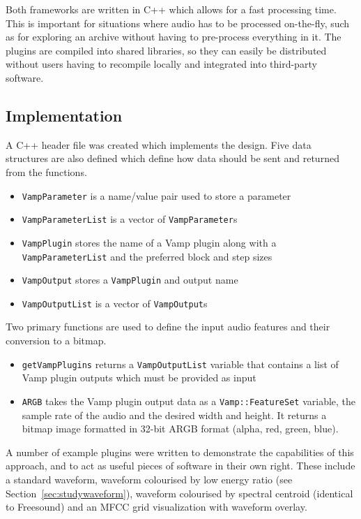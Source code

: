 Both frameworks are written in C++ which allows for a fast processing time.  This is important for situations where
audio has to be processed on-the-fly, such as for exploring an archive without having to pre-process everything in it.
The plugins are compiled into shared libraries, so they can easily be distributed without users having to recompile
locally and integrated into third-party software.

\subsection{Implementation}
A C++ header file was created which implements the design.  Five data structures are also defined which define how data
should be sent and returned from the functions.

{\singlespacing
\begin{itemize}
  \item \texttt{VampParameter} is a name/value pair used to store a parameter
  \item \texttt{VampParameterList} is a vector of \texttt{VampParameter}s
  \item \texttt{VampPlugin} stores the name of a Vamp plugin along with a\\
    \texttt{VampParameterList} and the preferred block and step sizes
  \item \texttt{VampOutput} stores a \texttt{VampPlugin} and output name
  \item \texttt{VampOutputList} is a vector of \texttt{VampOutput}s
\end{itemize}
}

Two primary functions are used to define the input audio features and their conversion to a bitmap.

\begin{itemize}
  \item \texttt{getVampPlugins} returns a \texttt{VampOutputList} variable that contains a list of Vamp plugin outputs
    which must be provided as input
  \item \texttt{ARGB} takes the Vamp plugin output data as a \texttt{Vamp::FeatureSet} variable, the sample rate of the
    audio and the desired width and height. It returns a bitmap image formatted in 32-bit ARGB format (alpha, red,
    green, blue).
\end{itemize}

A number of example plugins were written to demonstrate the capabilities of this approach, and to act as useful pieces
of software in their own right.  These include a standard waveform, waveform colourised by low energy ratio (see
Section~\ref{sec:studywaveform}), waveform colourised by spectral centroid (identical to Freesound) and an MFCC grid
visualization with waveform overlay.

